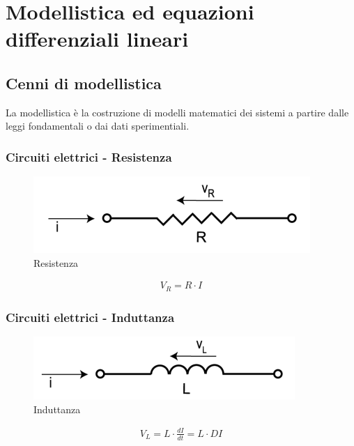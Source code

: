 \section{Modellistica ed equazioni differenziali lineari}



\subsection{Cenni di modellistica}

La modellistica è la costruzione di modelli matematici dei sistemi a partire dalle leggi fondamentali o dai dati sperimentiali.

\subsubsection{Circuiti elettrici - Resistenza}

\begin{figure}[!ht]
	\centering
	\includegraphics[width=0.3\columnwidth]{./images/resistenza.png}
	\caption{Resistenza}
	\label{fig:resistenza}
\end{figure}

\begin{align}
	V_R = R \cdot I
\end{align}


\subsubsection{Circuiti elettrici - Induttanza}

\begin{figure}[!ht]
	\centering
	\includegraphics[width=0.3\columnwidth]{./images/induttanza.png}
	\caption{Induttanza}
	\label{fig:induttanza}
\end{figure}

\begin{align}
	V_L = L \cdot \frac{dI}{dt} = L \cdot DI
\end{align}


